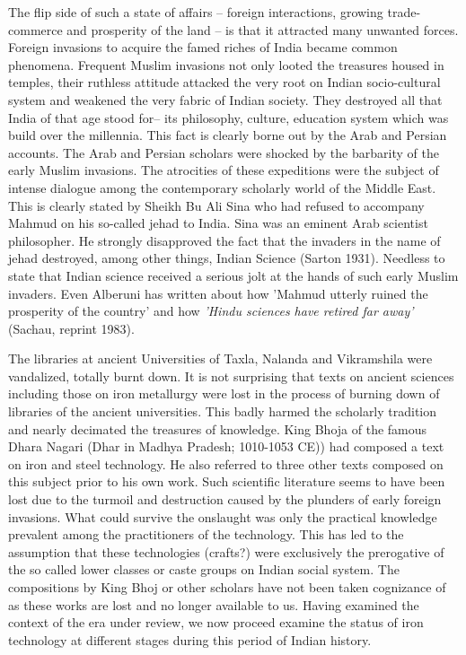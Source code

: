 The flip side of such a state of affairs – foreign interactions, growing trade-commerce and prosperity of the land – is that it attracted many unwanted forces. Foreign invasions to acquire the famed riches of India became common phenomena. Frequent Muslim invasions not only looted the treasures housed in temples, their ruthless attitude attacked the very root on Indian socio-cultural system and weakened the very fabric of Indian society. They destroyed all that India of that age stood for– its philosophy, culture, education system which was build over the millennia. This fact is clearly borne out by the Arab and Persian accounts. The Arab and Persian scholars were shocked by the barbarity of the early Muslim invasions. The atrocities of these expeditions were the subject of intense dialogue among the contemporary scholarly world of the Middle East. This is clearly stated by Sheikh Bu Ali Sina who had refused to accompany Mahmud on his so-called jehad to India. Sina was an eminent Arab scientist philosopher. He strongly disapproved the fact that the invaders in the name of jehad  destroyed, among other things, Indian Science (Sarton 1931). Needless to state that Indian science received a serious jolt at the hands of such early Muslim invaders. Even Alberuni has written about how 'Mahmud utterly ruined the prosperity of the country' and how {\it 'Hindu sciences have retired far away'} (Sachau, reprint 1983). 

The libraries at ancient Universities of Taxla, Nalanda and Vikramshila were vandalized, totally burnt down. It is not surprising that texts on ancient sciences including those on iron metallurgy were lost in the process of burning down of libraries of the ancient universities. This badly harmed the scholarly tradition and nearly decimated the treasures of knowledge. King Bhoja of the famous Dhara Nagari (Dhar in Madhya Pradesh; 1010-1053 CE)) had composed a text on iron and steel technology. He also referred to three other texts composed on this subject prior to his own work. Such scientific literature seems to have been lost due to the turmoil and destruction caused by the plunders of early foreign invasions. What could survive the onslaught was only the practical knowledge prevalent among the practitioners of the technology. This has led to the assumption that these technologies (crafts?) were exclusively the prerogative of the so called lower classes or caste groups on Indian social system. The compositions by King Bhoj or other scholars have not been taken cognizance of as these works are lost and no longer available to us. Having examined the context of the era under review, we now proceed examine the status of iron technology at different stages during this period of Indian history.

